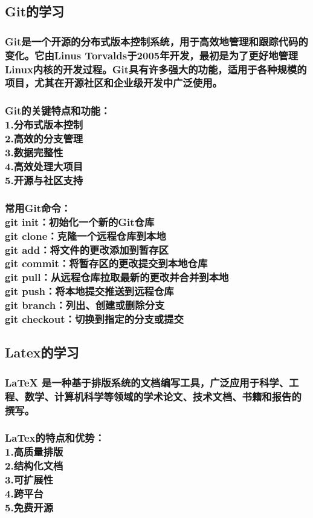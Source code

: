 \documentclass[UTF8,a4paper]{ctexart}
\begin{document}
\begin{sloppypar}
	\subsection{Git的学习}
	\subsubsection{Git是一个开源的分布式版本控制系统，用于高效地管理和跟踪代码的变化。它由Linus Torvalds于2005年开发，最初是为了更好地管理Linux内核的开发过程。Git具有许多强大的功能，适用于各种规模的项目，尤其在开源社区和企业级开发中广泛使用。}
	\subsubsection{Git的关键特点和功能：\\1.分布式版本控制\\2.高效的分支管理\\3.数据完整性\\4.高效处理大项目\\5.开源与社区支持}
	\subsubsection{常用Git命令：\\git init：初始化一个新的Git仓库\\git clone：克隆一个远程仓库到本地\\git add：将文件的更改添加到暂存区\\git commit：将暂存区的更改提交到本地仓库\\git pull：从远程仓库拉取最新的更改并合并到本地\\git push：将本地提交推送到远程仓库\\git branch：列出、创建或删除分支\\git checkout：切换到指定的分支或提交}
	
	\subsection{Latex的学习}
	\subsubsection{LaTeX 是一种基于排版系统的文档编写工具，广泛应用于科学、工程、数学、计算机科学等领域的学术论文、技术文档、书籍和报告的撰写。}
	\subsubsection{LaTex的特点和优势：\\1.高质量排版\\2.结构化文档\\3.可扩展性\\4.跨平台\\5.免费开源}
	


\end{sloppypar}
\end{document}

